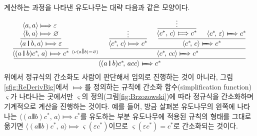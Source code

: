 계산하는 과정을 나타낸 유도나무는 대략 다음과 같은 모양이다.
\vspace*{-2.5ex}
\[%
\setpremisesend{-.25ex}
\inference{
  \inference*{
    \inference{
      \langle a,a\rangle \Longmapsto \varepsilon~ \\
      \langle b,a\rangle \Longmapsto \varnothing
    }{\langle a\VERT b,a\rangle \Longmapsto \varepsilon}
  }{
  \langle(a\VERT b)c^{*}\!,\,a\rangle \Longmapsto c^{*}
  }
& \text{\hspace{-2ex}\small$\!^{(\nu(a\!\VERT\!b)=\varnothing)}$}
& \inference{
    \inference*{\vdots}{
    \langle c^{*}\!,\,c\rangle \Longmapsto c^{*}
    }
  & \inference{
      \inference*{\vdots}{
      \langle c^{*},\,c\rangle \Longmapsto c^{*}
      }
    & \langle c^{*}\!,\,\varepsilon\rangle \LONGmapsto c^{*}
    }{
    \langle c^{*}\!,\,c\rangle \LONGmapsto c^{*}
    }
  }{
  \langle c^{*}\!,\,cc\rangle \LONGmapsto c^{*}
  }
}{
\langle(a\VERT b)c^{*}\!,\,acc\rangle \LONGmapsto c^{*}
}\vspace{-.5ex}
\]
위에서 정규식의 간소화도 사람이 판단해서 임의로 진행하는 것이 아니라,
그림\;\ref{sfig:ReDerivBig}에서 $\Longmapsto$를 정의하는 규칙에
간소화 함수(simplification function) $\varsigma$가 나타나는 곳에서만
$\varsigma$의 정의(그림\;\ref{fig:Brzozowski})에 따라 정규식을
간소화하며 기계적으로 계산을 진행하는 것이다. 예를 들어,
방금 살펴본 유도나무의 왼쪽에 나타나는
$\langle(a\VERT b)c^{*}\!,\,a\rangle \Longmapsto c^{*}$를
유도하는 부분 유도나무에 적용된 규칙의 형태를 그대로 옮기면
$\langle(a\VERT b)c^{*}\!,\,a\rangle
 \Longmapsto \varsigma(\varepsilon c^{*})$이므로
$\varsigma(\varepsilon c^{*}) = c^{*}$로 간소화되는 것이다.


